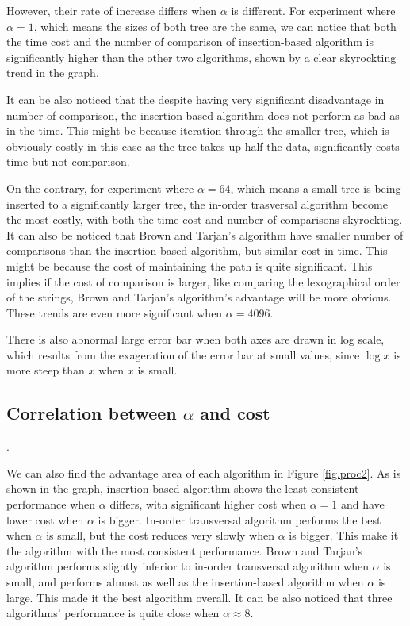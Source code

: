 \documentclass[12pt]{article}
\begin{document}
However, their rate of increase differs when $\alpha$ is different. For experiment where $\alpha = 1$, which means the sizes of both tree are the same, we can notice that both the time cost and the number of comparison of insertion-based algorithm is significantly higher than the other two algorithms, shown by a clear skyrockting trend in the graph. 

It can be also noticed that the despite having very significant disadvantage in number of comparison, the insertion based algorithm does not perform as bad as in the time. This might be because iteration through the smaller tree, which is obviously costly in this case as the tree takes up half the data, significantly costs time but not comparison.

On the contrary, for experiment where $\alpha = 64$, which means a small tree is being inserted to a significantly larger tree, the in-order trasversal algorithm become the most costly, with both the time cost and number of comparisons skyrockting. It can also be noticed that Brown and Tarjan's algorithm have smaller number of comparisons than the insertion-based algorithm, but similar cost in time. This might be because the cost of maintaining the path is quite significant. This implies if the cost of comparison is larger, like comparing the lexographical order of the strings, Brown and Tarjan's algorithm's advantage will be more obvious. These trends are even more significant when $\alpha = 4096$.

There is also abnormal large error bar when both axes are drawn in log scale, which results from the exageration of the error bar at small values, since $\log x$ is more steep than $x$ when $x$ is small.

\subsection{Correlation between $\alpha$ and cost}.

We can also find the advantage area of each algorithm in Figure \ref{fig.proc2}. As is shown in the graph, insertion-based algorithm shows the least consistent performance when $\alpha$ differs, with significant higher cost when $\alpha = 1$ and have lower cost when $\alpha$ is bigger. In-order transversal algorithm performs the best when $\alpha$ is small, but the cost reduces very slowly when $\alpha$ is bigger. This make it the algorithm with the most consistent performance. Brown and Tarjan's algorithm performs slightly inferior to in-order transversal algorithm when $\alpha$ is small, and performs almost as well as the insertion-based algorithm when $\alpha$ is large. This made it the best algorithm overall. It can be also noticed that three algorithms' performance is quite close when $\alpha \approx 8$.
\end{document}
